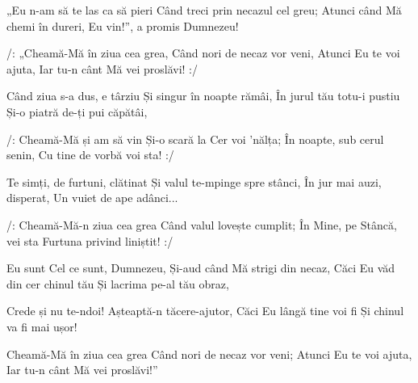 \beginverse
„Eu n-am să te las ca să pieri
Când treci prin necazul cel greu;
Atunci când Mă chemi în dureri,
Eu vin!”, a promis Dumnezeu!
\endverse

\beginchorus
/: „Cheamă-Mă în ziua cea grea,
Când nori de necaz vor veni,
Atunci Eu te voi ajuta,
Iar tu-n cânt Mă vei proslăvi! :/
\endchorus

\beginverse
Când ziua s-a dus, e târziu
Și singur în noapte rămâi,
În jurul tău totu-i pustiu
Și-o piatră de-ți pui căpătâi,
\endverse

\beginchorus
/: Cheamă-Mă și am să vin
Și-o scară la Cer voi ’nălța;
În noapte, sub cerul senin,
Cu tine de vorbă voi sta! :/
\endchorus

\beginverse
Te simți, de furtuni, clătinat
Și valul te-mpinge spre stânci,
În jur mai auzi, disperat,
Un vuiet de ape adânci...
\endverse

\beginchorus
/: Cheamă-Mă-n ziua cea grea
Când valul lovește cumplit;
În Mine, pe Stâncă, vei sta
Furtuna privind liniștit! :/
\endchorus

\beginverse
Eu sunt Cel ce sunt, Dumnezeu,
Și-aud când Mă strigi din necaz,
Căci Eu văd din cer chinul tău
Și lacrima pe-al tău obraz,
\endverse

\beginchorus
Crede și nu te-ndoi!
Așteaptă-n tăcere-ajutor,
Căci Eu lângă tine voi fi
Și chinul va fi mai ușor!
\endchorus

\beginchorus
Cheamă-Mă în ziua cea grea
Când nori de necaz vor veni;
Atunci Eu te voi ajuta,
Iar tu-n cânt Mă vei proslăvi!”
\endchorus
\endsong